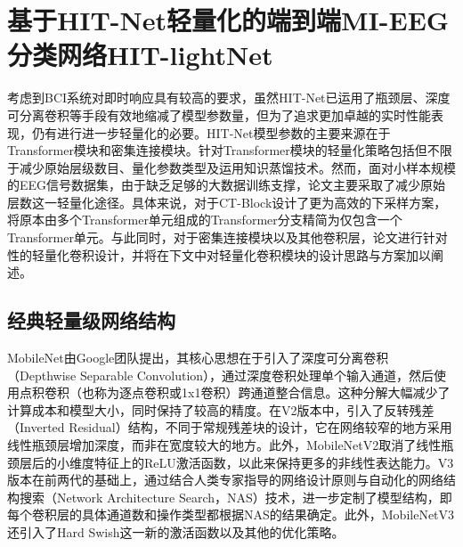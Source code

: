 \section{基于HIT-Net轻量化的端到端MI-EEG分类网络HIT-lightNet}

考虑到BCI系统对即时响应具有较高的要求，虽然HIT-Net已运用了瓶颈层、深度可分离卷积等手段有效地缩减了模型参数量，但为了追求更加卓越的实时性能表现，仍有进行进一步轻量化的必要。HIT-Net模型参数的主要来源在于Transformer模块和密集连接模块。针对Transformer模块的轻量化策略包括但不限于减少原始层级数目、量化参数类型及运用知识蒸馏技术。然而，面对小样本规模的EEG信号数据集，由于缺乏足够的大数据训练支撑，论文主要采取了减少原始层数这一轻量化途径。具体来说，对于CT-Block设计了更为高效的下采样方案，将原本由多个Transformer单元组成的Transformer分支精简为仅包含一个Transformer单元。与此同时，对于密集连接模块以及其他卷积层，论文进行针对性的轻量化卷积设计，并将在下文中对轻量化卷积模块的设计思路与方案加以阐述。

\subsection{经典轻量级网络结构}

MobileNet\cite{howard2017mobilenets}由Google团队提出，其核心思想在于引入了深度可分离卷积（Depthwise Separable Convolution），通过深度卷积处理单个输入通道，然后使用点积卷积（也称为逐点卷积或1x1卷积）跨通道整合信息。这种分解大幅减少了计算成本和模型大小，同时保持了较高的精度。在V2版本中，引入了反转残差（Inverted Residual）结构\cite{sandler2018mobilenetv2}，不同于常规残差块的设计，它在网络较窄的地方采用线性瓶颈层增加深度，而非在宽度较大的地方。此外，MobileNetV2取消了线性瓶颈层后的小维度特征上的ReLU激活函数，以此来保持更多的非线性表达能力。V3版本在前两代的基础上，通过结合人类专家指导的网络设计原则与自动化的网络结构搜索（Network Architecture Search，NAS）技术\cite{howard2019searching}，进一步定制了模型结构，即每个卷积层的具体通道数和操作类型都根据NAS的结果确定。此外，MobileNetV3还引入了Hard Swish这一新的激活函数以及其他的优化策略。

